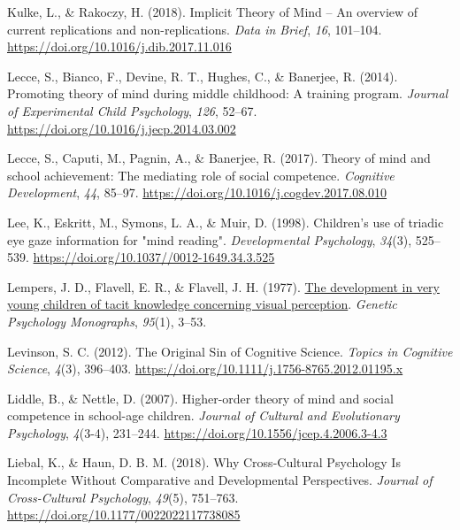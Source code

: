 \documentclass[
]{scrbook}
\newlength{\cslhangindent}
\newenvironment{CSLReferences}[2] %
 {\begin{list}{}{%
  \setlength{\itemindent}{0pt}
  \setlength{\leftmargin}{0pt}
  \setlength{\parsep}{0pt}
  \ifodd #1
   \setlength{\leftmargin}{\cslhangindent}
   \setlength{\itemindent}{-1\cslhangindent}
  \fi
  \setlength{\itemsep}{#2\baselineskip}}}
 {\end{list}}
\begin{document}
\begin{CSLReferences}{1}{0}
Kulke, L., \& Rakoczy, H. (2018). Implicit {Theory} of {Mind} -- {An} overview of current replications and non-replications. \emph{Data in Brief}, \emph{16}, 101--104. \url{https://doi.org/10.1016/j.dib.2017.11.016}

Lecce, S., Bianco, F., Devine, R. T., Hughes, C., \& Banerjee, R. (2014). Promoting theory of mind during middle childhood: {A} training program. \emph{Journal of Experimental Child Psychology}, \emph{126}, 52--67. \url{https://doi.org/10.1016/j.jecp.2014.03.002}

Lecce, S., Caputi, M., Pagnin, A., \& Banerjee, R. (2017). Theory of mind and school achievement: {The} mediating role of social competence. \emph{Cognitive Development}, \emph{44}, 85--97. \url{https://doi.org/10.1016/j.cogdev.2017.08.010}

Lee, K., Eskritt, M., Symons, L. A., \& Muir, D. (1998). Children's use of triadic eye gaze information for "mind reading". \emph{Developmental Psychology}, \emph{34}(3), 525--539. \url{https://doi.org/10.1037//0012-1649.34.3.525}

Lempers, J. D., Flavell, E. R., \& Flavell, J. H. (1977). \href{https://www.ncbi.nlm.nih.gov/pubmed/849832}{The development in very young children of tacit knowledge concerning visual perception}. \emph{Genetic Psychology Monographs}, \emph{95}(1), 3--53.

Levinson, S. C. (2012). The {Original Sin} of {Cognitive Science}. \emph{Topics in Cognitive Science}, \emph{4}(3), 396--403. \url{https://doi.org/10.1111/j.1756-8765.2012.01195.x}

Liddle, B., \& Nettle, D. (2007). Higher-order theory of mind and social competence in school-age children. \emph{Journal of Cultural and Evolutionary Psychology}, \emph{4}(3-4), 231--244. \url{https://doi.org/10.1556/jcep.4.2006.3-4.3}

Liebal, K., \& Haun, D. B. M. (2018). Why {Cross-Cultural Psychology Is Incomplete Without Comparative} and {Developmental Perspectives}. \emph{Journal of Cross-Cultural Psychology}, \emph{49}(5), 751--763. \url{https://doi.org/10.1177/0022022117738085}


\end{CSLReferences}
\end{document}
